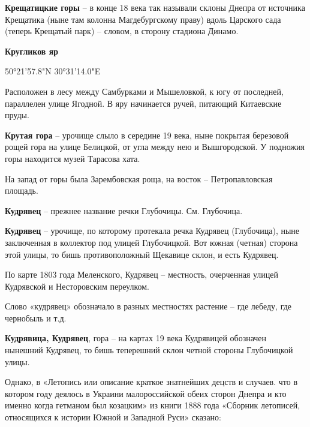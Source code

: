 \medskip

\textbf{Крещатицкие горы} – в конце 18 века так называли склоны Днепра от источника Крещатика (ныне там колонна Магдебургскому праву) вдоль Царского сада (теперь Крещатый парк) – словом, в сторону стадиона Динамо.\\

\medskip

\textbf{Кругликов яр} 

50°21'57.8"N 30°31'14.0"E

Расположен в лесу между Самбурками и Мышеловкой, к югу от последней, параллелен улице Ягодной. В яру начинается ручей, питающий Китаевские пруды.\\

\medskip

\textbf{Крутая гора} – урочище слыло в середине 19 века, ныне покрытая березовой рощей гора на улице Белицкой, от угла между нею и Вышгородской. У подножия горы находится музей Тарасова хата.

На запад от горы была Зарембовская роща, на восток – Петропавловская площадь.\\

\medskip

\textbf{Кудрявец} – прежнее название речки Глубочицы. См. Глубочица.\\


\medskip

\textbf{Кудрявец} – урочище, по которому протекала речка Кудрявец (Глубочица), ныне заключенная в коллектор под улицей Глубочицкой. Вот южная (четная) сторона этой улицы, то бишь противоположный Щекавице склон, и есть Кудрявец.

По карте 1803 года Меленского, Кудрявец – местность, очерченная улицей Кудрявской и Несторовским переулком.

Слово «кудрявец» обозначало в разных местностях растение – где лебеду, где чернобыль и т.д.\\

\medskip

\textbf{Кудрявица, Кудрявец}, гора – на картах 19 века Кудрявицей обозначен нынешний Кудрявец, то бишь теперешний склон четной стороны Глубочицкой улицы.

Однако, в «Летопись или описание краткое знатнейших децств и случаев. что в котором году деялось в Украини малороссийской обеих сторон Днепра и кто именно когда гетманом был козацким» из книги 1888 года «Сборник летописей, относящихся к истории Южной и Западной Руси» сказано:

